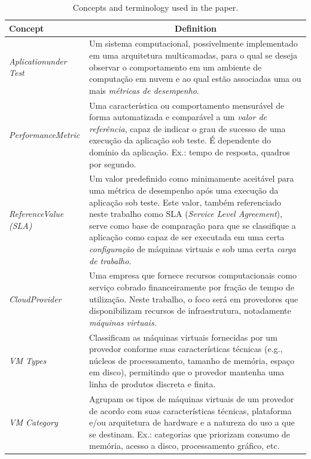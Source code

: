 \documentclass[10pt,conference,compsocconf]{IEEEtran}
\begin{document}
\begin{table}[t*]
\setlength{\tabcolsep}{3pt}
\centering%
\caption{Concepts and terminology used in the paper.}
\label{tab:concepts}
\begin{tabularx}{\linewidth}{|p{1.35cm}|X|}
\hline%
\centering Concept & \multicolumn{1}{c|}{Definition} \\
\hline
\emph{Aplication\newline under Test} & Um sistema computacional, possivelmente implementado em uma arquitetura multicamadas, para o qual se deseja observar o comportamento em um ambiente de computação em nuvem e ao qual estão associadas uma ou mais {\em métricas de desempenho}.
\\%
\hline
\emph{Performance\newline Metric} &
Uma característica ou comportamento mensurável de forma automatizada e comparável a um {\em valor de referência}, capaz de indicar o grau de sucesso de uma execução da aplicação sob teste. É dependente do domínio da aplicação. Ex.: tempo de resposta, quadros por segundo.
\\%
\hline
\emph{Reference\newline Value (SLA)} &
Um valor predefinido como minimamente aceitável  para uma métrica de desempenho após uma execução da aplicação sob teste. Este valor, também referenciado neste trabalho como SLA (\emph{Service Level Agreement}), serve como base de comparação para que se classifique a aplicação como capaz de ser executada em uma certa {\em configuração} de máquinas virtuais e sob uma certa {\em carga de trabalho}.
\\%
\hline
\emph{Cloud\newline Provider} &
Uma empresa que fornece recursos computacionais como serviço cobrado financeiramente por fração de tempo de utilização. Neste trabalho, o foco será em provedores que disponibilizam recursos de infraestrutura, notadamente {\em máquinas virtuais}.
\\%
\hline
\emph{VM Types} &
Classificam as máquinas virtuais fornecidas por um provedor conforme suas características técnicas (e.g., núcleos de processamento, tamanho de memória, espaço em disco), permitindo que o provedor mantenha uma linha de produtos discreta e finita.
\\%
\hline
\emph{VM Category} &
Agrupam os tipos de máquinas virtuais de um provedor de acordo com suas características técnicas, plataforma e/ou arquitetura de hardware e a natureza do uso a que se destinam. Ex.: categorias que priorizam consumo de memória, acesso a disco, processamento gráfico, etc. 

\end{tabularx}
\end{table}
\end{document}
